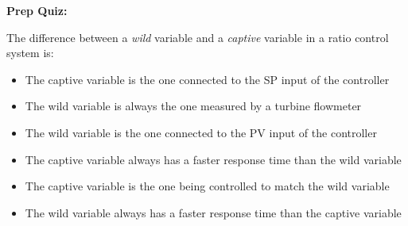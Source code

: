 \vfil \eject

\noindent
{\bf Prep Quiz:}

The difference between a {\it wild} variable and a {\it captive} variable in a ratio control system is:

\begin{itemize}
\item{} The captive variable is the one connected to the SP input of the controller
\vskip 5pt 
\item{} The wild variable is always the one measured by a turbine flowmeter
\vskip 5pt 
\item{} The wild variable is the one connected to the PV input of the controller
\vskip 5pt 
\item{} The captive variable always has a faster response time than the wild variable
\vskip 5pt 
\item{} The captive variable is the one being controlled to match the wild variable
\vskip 5pt 
\item{} The wild variable always has a faster response time than the captive variable
\end{itemize}





